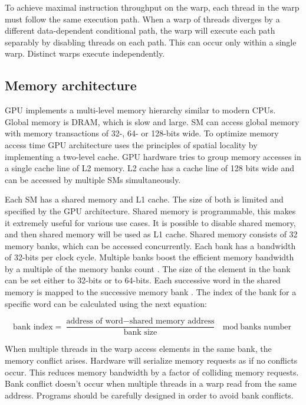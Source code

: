 To achieve maximal instruction throughput on the warp, each thread in the warp must follow the same execution path.
When a warp of threads diverges by a different data-dependent conditional path, the warp will execute each path separably by disabling threads on each path.
This can occur only within a single warp.
Distinct warps execute independently.

\subsection{Memory architecture}

GPU implements a multi-level memory hierarchy similar to modern CPUs.
Global memory is DRAM, which is slow and large.
SM can access global memory with memory transactions of 32-, 64- or 128-bits wide.
To optimize memory access time GPU architecture uses the principles of spatial locality by implementing a two-level cache.
GPU hardware tries to group memory accesses in a single cache line of L2 memory.
L2 cache has a cache line of 128 bits wide and can be accessed by multiple SMs simultaneously.

Each SM has a shared memory and L1 cache.
The size of both is limited and specified by the GPU architecture.
Shared memory is programmable, this makes it extremely useful for various use cases.
It is possible to disable shared memory, and then shared memory will be used as L1 cache.
Shared memory consists of 32 memory banks, which can be accessed concurrently.
Each bank has a bandwidth of 32-bits per clock cycle.
Multiple banks boost the efficient memory bandwidth by a multiple of the memory banks count \cite{CUDAProgramming}.
The size of the element in the bank can be set either to 32-bits or to 64-bits.
Each successive word in the shared memory is mapped to the successive memory bank \cite{SharedMemory}.
The index of the bank for a specific word can be calculated using the next equation:

\[ \text{bank index} = \frac{\text{address of word} - \text{shared memory address}}{\text{bank size}} \mod \text{banks number} \]

When multiple threads in the warp access elements in the same bank, the memory conflict arises.
Hardware will serialize memory requests as if no conflicts occur.
This reduces memory bandwidth by a factor of colliding memory requests.
Bank conflict doesn’t occur when multiple threads in a warp read from the same address.
Programs should be carefully designed in order to avoid bank conflicts.


